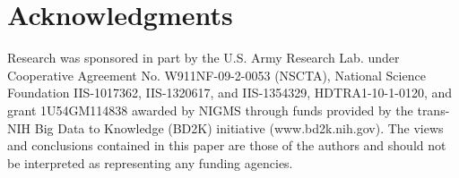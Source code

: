 \documentclass[letterpaper]{sig-alternate-2013}
\begin{document}
\section{Acknowledgments}
Research was sponsored in part by the U.S. Army Research Lab. under Cooperative Agreement No. W911NF-09-2-0053 (NSCTA), National Science Foundation IIS-1017362, IIS-1320617, and IIS-1354329, HDTRA1-10-1-0120, and grant 1U54GM114838 awarded by NIGMS through funds provided by the trans-NIH Big Data to Knowledge (BD2K) initiative (www.bd2k.nih.gov). The views and conclusions contained in this paper are those of the authors and should not be interpreted as representing any funding agencies.



\newpage
\balance
\small


\end{document}
